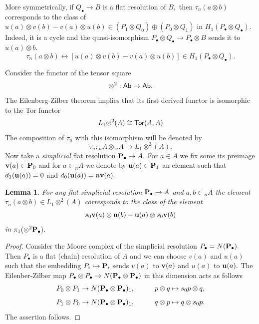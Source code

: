 \documentclass{amsart}
\numberwithin{equation}{section}
\newtheorem{lemma}[theorem]{Lemma}
\theoremstyle{definition}
\begin{document}
More symmetrically, if $Q_\bullet \to B$ is a flat resolution of $B,$ then $\tau_n(a\otimes b)$ corresponds to the class of $u(a)\otimes v(b)-v(a)\otimes u(b)\in (P_1\otimes Q_0)\oplus (P_0\otimes Q_1) $ in $H_1(P_\bullet\otimes  Q_\bullet).$ Indeed, it is a cycle and the quasi-isomorphism $P_\bullet \otimes Q_\bullet \to P_\bullet \otimes B$ 
sends it to $u(a)\otimes b.$
\begin{equation}
  \tau_n(a\otimes b) \leftrightarrow  [u(a)\otimes  v(b) -  v(a)\otimes u(b)]\in H_1(P_\bullet\otimes Q_\bullet).  
\end{equation}


Consider the functor of the  tensor square $$\otimes^2:{\sf Ab}\to {\sf Ab}.$$ The Eilenberg-Zilber theorem implies that its first derived functor is isomorphic to the Tor functor
$$  
L_1{\otimes}^2(A) \cong {\sf Tor}(A,A)
$$ 
The composition of $\tau_n$ with this isomorphism will be denoted by
$$\tilde \tau_n : {}_nA \otimes {}_nA \longrightarrow L_1{\otimes}^2(A).$$
Now take a {\it simplicial} flat resolution  ${\bf P}_\bullet\to A.$ For $a\in A$ we fix some its preimage ${\bf v}(a)\in {\bf P}_0$  and for $a\in {}_nA$ we denote by ${\bf u}(a)\in  {\bf P}_1$  an element such that $d_1({\bf u}(a))=0$ and $d_0({\bf u}(a))=n{\bf v}(a).$

\begin{lemma}\label{lemma_L_1tensor} For any flat simplicial resolution ${\bf P}_\bullet\to A$ and $a,b\in {}_nA$
the element $\tilde \tau_n(a\otimes b) \in L_1{\otimes}^2(A)$ corresponds to the class of the element $$s_0{\bf v}(a)\otimes {\bf u}(b)-{\bf u}(a)\otimes s_0{\bf v}(b)$$ in $\pi_1(\otimes^2 {\bf P}_\bullet).$ 
\end{lemma}
\begin{proof}
Consider the Moore complex of the simplicial resolution $P_\bullet=N({\bf P}_\bullet).$ Then $P_\bullet$ is a flat (chain) resolution of $A$ and we can choose $v(a)$ and $u(a)$ such that the embedding $P_i\hookrightarrow {\bf P}_i$ sends ${v}(a)$ to ${\bf v}(a)$ and $u(a)$ to ${\bf u}(a).$ The Eilenber-Zilber map $P_\bullet \otimes P_\bullet \to N( {\bf P}_\bullet \otimes {\bf P}_\bullet)$ in this dimension acts as follows
$$P_0\otimes P_1 \to N({\bf P}_\bullet\otimes {\bf P}_\bullet)_1, \hspace{1cm} p\otimes q \mapsto s_0p\otimes q,$$
$$P_1\otimes P_0 \to N({\bf P}_\bullet\otimes {\bf P}_\bullet)_1, \hspace{1cm} q\otimes p \mapsto q\otimes s_0p.$$
The assertion follows. 
\end{proof}
\end{document}
